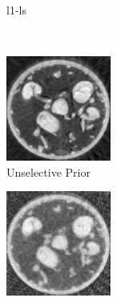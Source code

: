 \documentclass[journal]{IEEEtran}
\begin{document}
\begin{figure}[!h]
\begin{subfigure}[b]{0.3\linewidth}
        \caption{l1-ls}
     \end{subfigure}\\
\quad
    \begin{subfigure}[b]{0.3\linewidth}
        \includegraphics[width=\textwidth]{../images/sprouts/plainPriorIm.png}
        \caption{Unselective Prior}
     \end{subfigure}
\quad
    \begin{subfigure}[b]{0.3\linewidth}
        \includegraphics[width=\textwidth]{../images/sprouts/weightedPriorIm.png}

\end{subfigure}
\end{figure}
\end{document}
